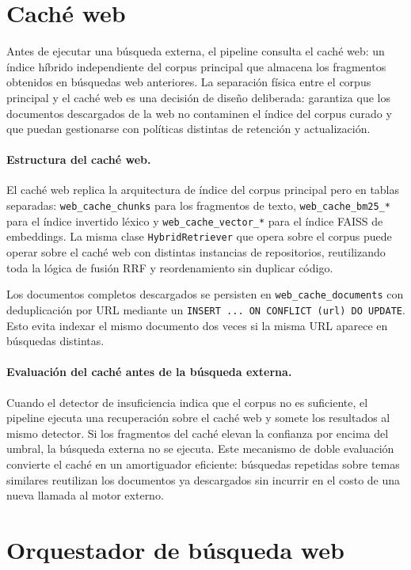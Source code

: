 \documentclass[11pt]{article}
\begin{document}
\section{Caché web}

Antes de ejecutar una búsqueda externa, el pipeline consulta el caché web: un índice híbrido
independiente del corpus principal que almacena los fragmentos obtenidos en búsquedas web
anteriores. La separación física entre el corpus principal y el caché web es una decisión de
diseño deliberada: garantiza que los documentos descargados de la web no contaminen el índice
del corpus curado y que puedan gestionarse con políticas distintas de retención y actualización.

\paragraph{Estructura del caché web.}
El caché web replica la arquitectura de índice del corpus principal pero en tablas separadas:
\texttt{web\_cache\_chunks} para los fragmentos de texto, \texttt{web\_cache\_bm25\_*} para el
índice invertido léxico y \texttt{web\_cache\_vector\_*} para el índice FAISS de embeddings.
La misma clase \texttt{HybridRetriever} que opera sobre el corpus puede operar sobre el caché
web con distintas instancias de repositorios, reutilizando toda la lógica de fusión RRF y
reordenamiento sin duplicar código.

Los documentos completos descargados se persisten en \texttt{web\_cache\_documents} con
deduplicación por URL mediante un \texttt{INSERT ... ON CONFLICT (url) DO UPDATE}. Esto evita
indexar el mismo documento dos veces si la misma URL aparece en búsquedas distintas.

\paragraph{Evaluación del caché antes de la búsqueda externa.}
Cuando el detector de insuficiencia indica que el corpus no es suficiente, el pipeline ejecuta
una recuperación sobre el caché web y somete los resultados al mismo detector. Si los fragmentos
del caché elevan la confianza por encima del umbral, la búsqueda externa no se ejecuta. Este
mecanismo de doble evaluación convierte el caché en un amortiguador eficiente: búsquedas
repetidas sobre temas similares reutilizan los documentos ya descargados sin incurrir en el
costo de una nueva llamada al motor externo.

\section{Orquestador de búsqueda web}
\end{document}
